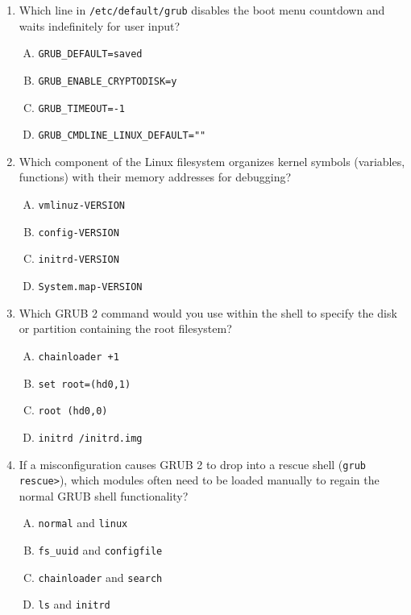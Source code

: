 \documentclass[a4paper]{report}
\begin{document}
\begin{enumerate}[1.]
    \item Which line in \texttt{/etc/default/grub} disables the boot menu countdown and waits indefinitely for user input?  
    \begin{enumerate}[A)]
        \item \texttt{GRUB\_DEFAULT=saved}  
        \item \texttt{GRUB\_ENABLE\_CRYPTODISK=y}  
        \item \texttt{GRUB\_TIMEOUT=-1}  
        \item \texttt{GRUB\_CMDLINE\_LINUX\_DEFAULT=""}  
    \end{enumerate}

    \item Which component of the Linux filesystem organizes kernel symbols (variables, functions) with their memory addresses for debugging?  
    \begin{enumerate}[A)]
        \item \texttt{vmlinuz-VERSION}  
        \item \texttt{config-VERSION}  
        \item \texttt{initrd-VERSION}  
        \item \texttt{System.map-VERSION}  
    \end{enumerate}

    \item Which GRUB 2 command would you use within the shell to specify the disk or partition containing the root filesystem?  
    \begin{enumerate}[A)]
        \item \texttt{chainloader +1}  
        \item \texttt{set root=(hd0,1)}  
        \item \texttt{root (hd0,0)}  
        \item \texttt{initrd /initrd.img}  
    \end{enumerate}

    \item If a misconfiguration causes GRUB 2 to drop into a rescue shell (\texttt{grub rescue>}), which modules often need to be loaded manually to regain the normal GRUB shell functionality?  
    \begin{enumerate}[A)]
        \item \texttt{normal} and \texttt{linux}  
        \item \texttt{fs\_uuid} and \texttt{configfile}  
        \item \texttt{chainloader} and \texttt{search}  
        \item \texttt{ls} and \texttt{initrd}  
    \end{enumerate}

\end{enumerate}
\end{document}
